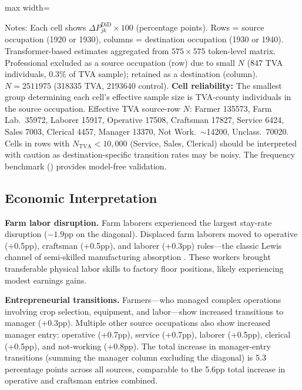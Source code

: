 \documentclass[12pt]{article}
\begin{document}
\begin{table}[H]
\begin{adjustbox}{max width=\textwidth}
\begin{threeparttable}
\begin{tablenotes}[flushleft]
\item Notes: Each cell shows $\Delta P_{jk}^{\text{DiD}} \times 100$ (percentage points). Rows = source occupation (1920 or 1930), columns = destination occupation (1930 or 1940). Transformer-based estimates aggregated from $575 \times 575$ token-level matrix. Professional excluded as a source occupation (row) due to small $N$ (847 TVA individuals, 0.3\% of TVA sample); retained as a destination (column). $N = \num{2511975}$ (\num{318335} TVA, \num{2193640} control). \textbf{Cell reliability:} The smallest group determining each cell's effective sample size is TVA-county individuals in the source occupation. Effective TVA source-row $N$: Farmer \num{135573}, Farm Lab.\ \num{35972}, Laborer \num{15917}, Operative \num{17508}, Craftsman \num{17827}, Service \num{6424}, Sales \num{7003}, Clerical \num{4457}, Manager \num{13370}, Not Work.\ $\sim$\num{14200}, Unclass.\ \num{70020}. Cells in rows with $N_{\text{TVA}} < 10{,}000$ (Service, Sales, Clerical) should be interpreted with caution as destination-specific transition rates may be noisy. The frequency benchmark () provides model-free validation.
\end{tablenotes}
\end{threeparttable}
\end{adjustbox}
\end{table}

\subsection{Economic Interpretation}

\textbf{Farm labor disruption.} Farm laborers experienced the largest stay-rate disruption ($-1.9$pp on the diagonal). Displaced farm laborers moved to operative (+0.5pp), craftsman (+0.5pp), and laborer (+0.3pp) roles---the classic Lewis channel of semi-skilled manufacturing absorption \citep{lewis1954}. These workers brought transferable physical labor skills to factory floor positions, likely experiencing modest earnings gains.

\textbf{Entrepreneurial transitions.} Farmers---who managed complex operations involving crop selection, equipment, and labor---show increased transitions to manager (+0.3pp). Multiple other source occupations also show increased manager entry: operative (+0.7pp), service (+0.7pp), laborer (+0.5pp), clerical (+0.5pp), and not-working (+0.8pp). The total increase in manager-entry transitions (summing the manager column excluding the diagonal) is 5.3 percentage points across all sources, comparable to the 5.6pp total increase in operative and craftsman entries combined.
\end{document}
